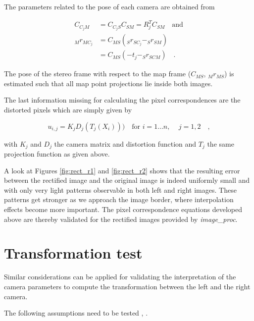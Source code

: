 The parameters related to the pose of each camera are obtained from

\begin{align}
  C_{C_jM} &= C_{C_jS} C_{SM} = R_j^TC_{SM} \hspace{1em} \text{and} \\
  _{M}r_{MC_j} &= C_{MS}(_{S}r_{SC_j} - _{S}r_{SM}) \\
  &= C_{MS}(-t_j - _{S}r_{SCM})\hspace{1em} \text{.}
\end{align}

The pose of the stereo frame with respect to the map frame ($C_{MS}$, $_{M}r_{MS}$) is estimated such that all map
point projections lie inside both images.

The last information missing for calculating the pixel correspondences are 
the distorted pixels which are simply given by 

\begin{equation}
  u_{i,j} = K_j D_j(T_j(X_i))) 
  \hspace{1em} \text{for } i = 1 \ldots n \text{, } \hspace{1em} j = 1,2
  \hspace{1em}\text{,}
  \label{eqn/rect/u_def}
\end{equation}

with $K_j$ and $D_j$ the camera matrix and distortion function and $T_j$ the same
projection function as given above. 

A look at Figures \ref{fig:rect_r1} and \ref{fig:rect_r2} shows that the resulting error
between the rectified image and the original image is indeed uniformly 
small and with only very light patterns observable in both left and right images.
These patterns get stronger as we approach the image border, where interpolation
effects become more important.
The pixel correspondence equations developed above are thereby validated for the 
rectified images provided by \textit{image\_proc}.

\newpage
\section{Transformation test}

Similar considerations can be applied for validating the interpretation of the
camera parameters to compute the transformation between the left and the right
camera.

The following assumptions need to be tested \cite{DocCameraInfo},
\cite[p. 523f]{Siciliano2007}.

